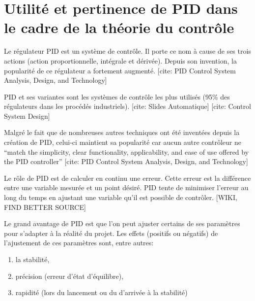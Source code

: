 
\section[PID Utilité/Pertinence]{Utilité et pertinence de PID dans le cadre de la théorie du contrôle}

Le régulateur PID est un système de contrôle. Il porte ce nom à cause de ses trois actions (action proportionnelle, intégrale et dérivée). Depuis son invention, la popularité de ce régulateur a fortement augmenté. [cite: PID Control System Analysis, Design, and Technology]

PID et ses variantes sont les systèmes de contrôle les plus utilisés (95\% des régulateurs dans les procédés industriels). [cite: Slides Automatique] [cite: Control System Design] 

Malgré le fait que de nombreuses autres techniques ont été inventées depuis la création de PID, celui-ci maintient sa popularité car aucun autre contrôleur ne ``match the simplicity, clear functionality, applicability, and ease of use offered by the PID controller'' [cite: PID Control System Analysis, Design, and Technology]

Le rôle de PID est de calculer en continu une erreur. Cette erreur est la différence entre une variable mesurée et un point désiré. PID tente de minimiser l'erreur au long du temps en ajustant une variable qu'il est possible de contrôler. [WIKI, FIND BETTER SOURCE] %

Le grand avantage de PID est que l'on peut ajuster certains de ses paramètres pour s'adapter à la réalité du projet. Les effets (positifs ou négatifs) de l'ajustement de ces paramètres sont, entre autres: 
\begin{enumerate}
\item la stabilité,
\item précision (erreur d'état d'équilibre),
\item rapidité (lors du lancement ou du d'arrivée à la stabilité)
\end{enumerate}

